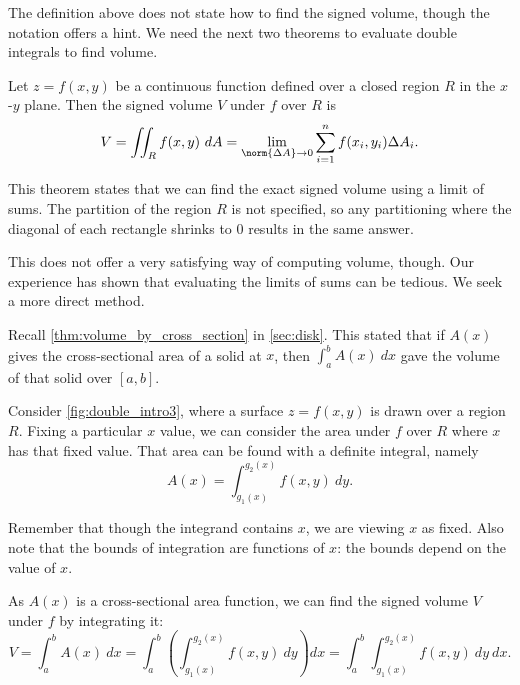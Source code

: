 The definition above does not state how to find the signed volume, though the notation offers a hint. We need the next two theorems to evaluate double integrals to find volume.

{Let $z=f(x,y)$ be a continuous function defined over a closed region $R$ in the $x$-$y$ plane. Then the signed volume $V$ under $f$ over $R$ is
$$V = \iint_R f(x,y)\ dA = \lim_{\norm{\Delta A}\to 0}\sum_{i=1}^n f(x_i,y_i)\Delta A_i.$$}

This theorem states that we can find the exact signed volume using a limit of sums. The partition of the region $R$ is not specified, so any partitioning where the diagonal of each rectangle shrinks to 0 results in the same answer. 

This does not offer a very satisfying way of computing volume, though. Our experience has shown that evaluating the limits of sums can be tedious. We seek a more direct method.

Recall \autoref{thm:volume_by_cross_section} in \autoref{sec:disk}. This stated that if $A(x)$ gives the cross-sectional area of a solid at $x$, then $\int_a^b A(x)\ dx$ gave the volume of that solid over $[a,b]$. 

Consider \autoref{fig:double_intro3}, where a surface $z=f(x,y)$ is drawn over a region $R$. Fixing a particular $x$ value, we can consider the area under $f$ over $R$ where $x$ has that fixed value. That area can be found with a definite integral, namely $$ A(x)=\int_{g_1(x)}^{g_2(x)} f(x,y)\ dy.$$

Remember that though the integrand contains $x$, we are viewing $x$ as fixed. Also note that the bounds of integration are functions of $x$: the bounds depend on the value of $x$. 


As $A(x)$ is a cross-sectional area function, we can find the signed volume $V$ under $f$ by integrating it:
$$V = \int_a^b A(x)\ dx = \int_a^b\left(\int_{g_1(x)}^{g_2(x)} f(x,y)\ dy\right)dx = \int_a^b\int_{g_1(x)}^{g_2(x)} f(x,y)\ dy\ dx.$$

